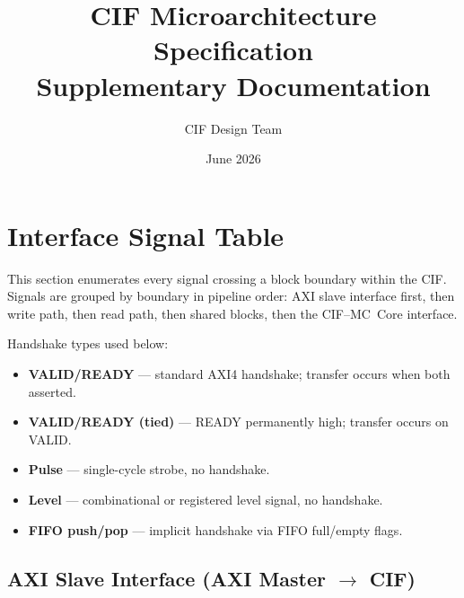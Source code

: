\documentclass[11pt,a4paper]{article}
\title{\textbf{CIF Microarchitecture Specification}\\
\large Supplementary Documentation}
\author{CIF Design Team}
\date{June 2026}
\begin{document}
\maketitle
\tableofcontents
\newpage

\section{Interface Signal Table}

This section enumerates every signal crossing a block boundary within the CIF.
Signals are grouped by boundary in pipeline order: AXI slave interface first,
then write path, then read path, then shared blocks, then the CIF--MC~Core
interface.

Handshake types used below:
\begin{itemize}
  \item \textbf{VALID/READY} --- standard AXI4 handshake; transfer occurs when both asserted.
  \item \textbf{VALID/READY (tied)} --- READY permanently high; transfer occurs on VALID.
  \item \textbf{Pulse} --- single-cycle strobe, no handshake.
  \item \textbf{Level} --- combinational or registered level signal, no handshake.
  \item \textbf{FIFO push/pop} --- implicit handshake via FIFO full/empty flags.
\end{itemize}

\subsection{AXI Slave Interface (AXI Master $\rightarrow$ CIF)}
\end{document}

